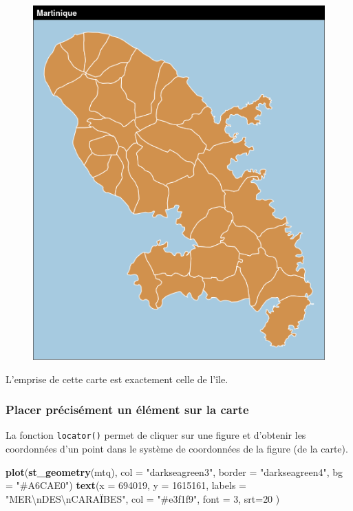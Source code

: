 \documentclass[]{book}
\newenvironment{Shaded}{\begin{snugshade}}{\end{snugshade}}
\newcommand{\KeywordTok}[1]{\textcolor[rgb]{0.13,0.29,0.53}{\textbf{#1}}}
\newcommand{\DataTypeTok}[1]{\textcolor[rgb]{0.13,0.29,0.53}{#1}}
\newcommand{\DecValTok}[1]{\textcolor[rgb]{0.00,0.00,0.81}{#1}}
\newcommand{\CharTok}[1]{\textcolor[rgb]{0.31,0.60,0.02}{#1}}
\newcommand{\StringTok}[1]{\textcolor[rgb]{0.31,0.60,0.02}{#1}}
\newcommand{\NormalTok}[1]{#1}
\begin{document}
\begin{figure}
\centering
\includegraphics{img/martinique2.png}
\caption{}
\end{figure}

L'emprise de cette carte est exactement celle de l'île.

\subsubsection{Placer précisément un élément sur la
carte}\label{placer-precisement-un-element-sur-la-carte}

La fonction \texttt{locator()} permet de cliquer sur une figure et
d'obtenir les coordonnées d'un point dans le système de coordonnées de
la figure (de la carte).

\begin{Shaded}
\begin{Highlighting}[]
\KeywordTok{plot}\NormalTok{(}\KeywordTok{st_geometry}\NormalTok{(mtq), }\DataTypeTok{col =} \StringTok{"darkseagreen3"}\NormalTok{, }\DataTypeTok{border =} \StringTok{"darkseagreen4"}\NormalTok{, }
     \DataTypeTok{bg =} \StringTok{"#A6CAE0"}\NormalTok{)}
\KeywordTok{text}\NormalTok{(}\DataTypeTok{x =} \DecValTok{694019}\NormalTok{, }\DataTypeTok{y =} \DecValTok{1615161}\NormalTok{, }
     \DataTypeTok{labels =} \StringTok{"MER}\CharTok{\textbackslash{}n}\StringTok{DES}\CharTok{\textbackslash{}n}\StringTok{CARAÏBES"}\NormalTok{, }
     \DataTypeTok{col =} \StringTok{"#e3f1f9"}\NormalTok{, }\DataTypeTok{font =} \DecValTok{3}\NormalTok{, }\DataTypeTok{srt=}\DecValTok{20}\NormalTok{ )}
\end{Highlighting}
\end{Shaded}
\end{document}
